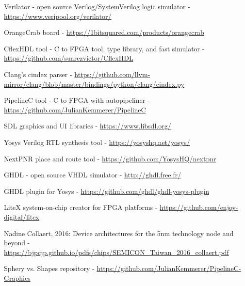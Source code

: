 \documentclass[conference]{IEEEtran}
\begin{document}
\begin{thebibliography}{00}

 Verilator - open source Verilog/SystemVerilog logic simulator - 
\url{https://www.veripool.org/verilator/}

 OrangeCrab board - \url{https://1bitsquared.com/products/orangecrab}

 CflexHDL tool - C to FPGA tool, type library, and fast simulator - 
\url{https://github.com/suarezvictor/CflexHDL}

 Clang's cindex parser - 
\url{https://github.com/llvm-mirror/clang/blob/master/bindings/python/clang/cindex.py}

 PipelineC tool - C to FPGA with autopipeliner -  \url{https://github.com/JulianKemmerer/PipelineC}

 SDL graphics and UI libraries - 
\url{https://www.libsdl.org/}

 Yosys Verilog RTL synthesis tool - 
\url{https://yosyshq.net/yosys/}

 NextPNR place and route tool - 
\url{https://github.com/YosysHQ/nextpnr}

 GHDL - open source VHDL simulator - 
\url{http://ghdl.free.fr/}

 GHDL plugin for Yosys - 
\url{https://github.com/ghdl/ghdl-yosys-plugin}

 LiteX system-on-chip creator for FPGA platforms - 
\url{https://github.com/enjoy-digital/litex}

 Nadine Collaert, 2016: Device architectures for the 5nm technology node and beyond - 
\url{https://bjpcjp.github.io/pdfs/chips/SEMICON_Taiwan_2016_collaert.pdf}

 Sphery vs. Shapes repository - \url{https://github.com/JulianKemmerer/PipelineC-Graphics}

\end{thebibliography}
\end{document}
